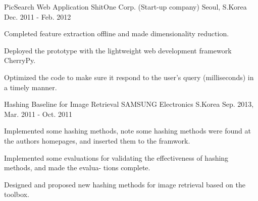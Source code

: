 \begin{cventries}
  \cventry
    {PicSearch Web Application} %
    {ShitOne Corp. (Start-up company)} %
    {Seoul, S.Korea} %
    {Dec. 2011 - Feb. 2012} %
    {
      \begin{cvitems} %
        \item {Completed feature extraction offline and made dimensionality reduction.}
        \item {Deployed the prototype with the lightweight web development framework CherryPy.}
        \item {Optimized the code to make sure it respond to the user’s query (milliseconds) in a timely manner.}
      \end{cvitems}
    }

  \cventry
    {Hashing Baseline for Image Retrieval} %
    {SAMSUNG Electronics} %
    {S.Korea} %
    {Sep. 2013, Mar. 2011 - Oct. 2011} %
    {
      \begin{cvitems} %
        \item {Implemented some hashing methods, note some hashing methods were found at the authors homepages, and inserted them to the framwork.}
        \item {Implemented some evaluations for validating the effectiveness of hashing methods, and made the evalua- tions complete.}
        \item {Designed and proposed new hashing methods for image retrieval based on the toolbox.}
      \end{cvitems}
    }

\end{cventries}
